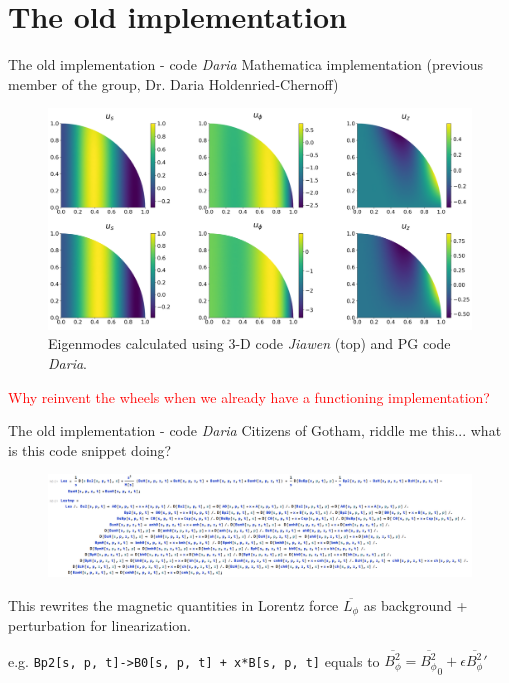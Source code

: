 \documentclass[11pt,aspectratio=169]{beamer}
\begin{document}
\section{The old implementation}
\begin{frame}{The old implementation - code \textit{Daria}}
    Mathematica implementation (previous member of the group, Dr. Daria Holdenried-Chernoff)
    \begin{figure}
        \centering
        \includegraphics[width=.6\linewidth]{elements/Daria__toroidal_bg_eigen1033-922.png}
        \caption{Eigenmodes calculated using 3-D code \textit{Jiawen} (top) and PG code \textit{Daria}.}
    \end{figure}
    \textcolor{red}{Why reinvent the wheels when we already have a functioning implementation?}
\end{frame}

\begin{frame}{The old implementation - code \textit{Daria}}
    Citizens of Gotham, riddle me this... what is this code snippet doing?
    \begin{figure}
        \centering
        \includegraphics[width=\linewidth]{elements/Mathematica_snippet_1.png}
    \end{figure}
	\pause
	This rewrites the magnetic quantities in Lorentz force $\overline{L_\phi}$ as background + perturbation for linearization.

	e.g. \texttt{Bp2[s, p, t]->B0[s, p, t] + x*B[s, p, t]} equals to $\overline{B_\phi^2} = \overline{B_\phi^2}_0 + \epsilon \overline{B_\phi^2}'$
\end{frame}
\end{document}
